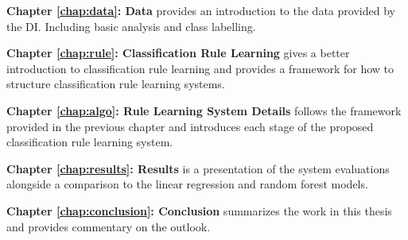 \textbf{Chapter \ref{chap:data}: Data} provides an introduction to the data provided by the DI. Including basic analysis and class labelling.

\textbf{Chapter \ref{chap:rule}: Classification Rule Learning} gives a better introduction to classification rule learning and provides a framework for how to structure classification rule learning systems.

\textbf{Chapter \ref{chap:algo}: Rule Learning System Details} follows the framework provided in the previous chapter and introduces each stage of the proposed classification rule learning system.

\textbf{Chapter \ref{chap:results}: Results} is a presentation of the \Abb system evaluations alongside a comparison to the linear regression and random forest models.

\textbf{Chapter \ref{chap:conclusion}: Conclusion} summarizes the work in this thesis and provides commentary on the outlook.


